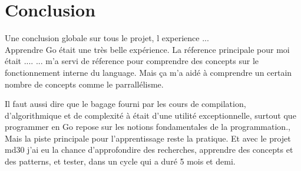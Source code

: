 \section{Conclusion}

Une conclusion globale sur tous le projet, l experience ...\\
Apprendre Go était une très belle expérience. La réference principale
pour moi était .... 
... m'a servi de réference pour
comprendre des concepts sur le fonctionnement interne du language.
Mais ça m'a aidé à comprendre un certain nombre de concepts comme le parrallélisme.

\bigskip
Il faut aussi dire que le bagage fourni par les cours de compilation, d'algorithmique et de complexité à
\establishment{} était d'une utilité exceptionnelle, surtout que
programmer en Go repose sur les notions fondamentales de la programmation., \\[0.3cm]
Mais la piste principale pour l'apprentissage reste la pratique. Et avec
le projet \gls{md30} j'ai eu la chance d'approfondire des recherches,
apprendre des concepts et des patterns, et tester, dans un cycle qui a
duré 5 mois et demi. 